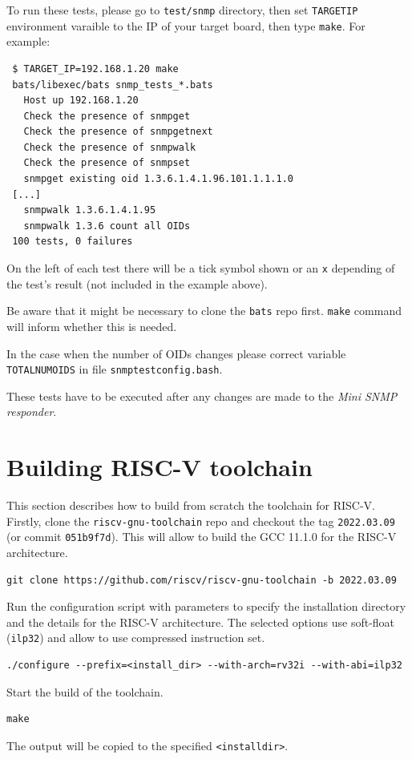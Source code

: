 \documentclass[a4paper, 12pt]{article}
\renewcommand{\_}{\underscore\allowbreak}
\begin{document}
To run these tests, please go to \texttt{test/snmp} directory, then set
\texttt{TARGET\_IP} environment varaible to the IP of your target board, then type
\texttt{make}. For example:
\begin{lstlisting}
 $ TARGET_IP=192.168.1.20 make
 bats/libexec/bats snmp_tests_*.bats
   Host up 192.168.1.20
   Check the presence of snmpget
   Check the presence of snmpgetnext
   Check the presence of snmpwalk
   Check the presence of snmpset
   snmpget existing oid 1.3.6.1.4.1.96.101.1.1.1.0
 [...]
   snmpwalk 1.3.6.1.4.1.95
   snmpwalk 1.3.6 count all OIDs
 100 tests, 0 failures
\end{lstlisting}
On the left of each test there will be a tick symbol shown or an \texttt{x}
depending of the test's result (not included in the example above).

Be aware that it might be necessary to clone the \texttt{bats} repo first.
\texttt{make} command will inform whether this is needed.

In the case when the number of OIDs changes please correct variable \texttt{TOTAL\_NUM\_OIDS}
in file \texttt{snmp\_test\_config.bash}.

These tests have to be executed after any changes are made to the \textit{Mini SNMP
responder}.


\newpage
\section{Building RISC-V toolchain}
\label{appendix:building_RISCV_toolchain}

This section describes how to build from scratch the toolchain for RISC-V.
Firstly, clone the \texttt{riscv-gnu-toolchain} repo and checkout the tag
\texttt{2022.03.09} (or commit \texttt{051b9f7d}). This will allow to build
the GCC 11.1.0 for the RISC-V architecture.
\begin{lstlisting}
git clone https://github.com/riscv/riscv-gnu-toolchain -b 2022.03.09
\end{lstlisting}
Run the configuration script with parameters to specify the installation
directory and the details for the RISC-V architecture.
The selected options use soft-float (\texttt{ilp32}) and allow to use
compressed instruction set.
\begin{lstlisting}
./configure --prefix=<install_dir> --with-arch=rv32i --with-abi=ilp32
\end{lstlisting}
Start the build of the toolchain.
\begin{lstlisting}
make
\end{lstlisting}
The output will be copied to the specified \texttt{<install\_dir>}.
\end{document}
